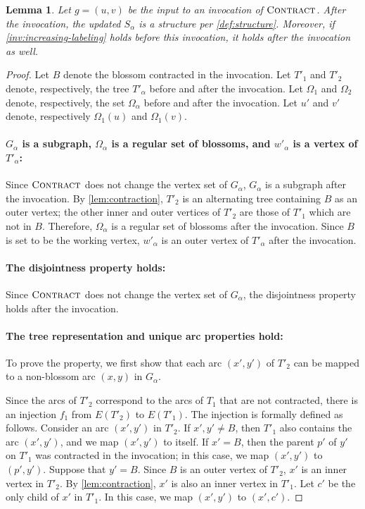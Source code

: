 \documentclass{article}
\newcommand{\alp}{\alpha}
\newcommand{\Omg}{\Omega}
\newcommand{\algContract}{\textsc{Contract}\xspace}
\newtheorem{lemma}[theorem]{Lemma}
\begin{document}
\begin{lemma} \label{lem:appendix2} Let $g = (u, v)$ be the input to an invocation of $\algContract$.
After the invocation, the updated $S_\alp$ is a structure per \cref{def:structure}.
Moreover, if \cref{inv:increasing-labeling} holds before this invocation, it holds after the invocation as well.
\end{lemma}
\begin{proof}
Let $B$ denote the blossom contracted in the invocation.
Let $T'_1$ and $T'_2$ denote, respectively, the tree $T'_\alp$ before and after the invocation.
Let $\Omg_1$ and $\Omg_2$ denote, respectively, the set $\Omg_\alp$ before and after the invocation.
Let $u'$ and $v'$ denote, respectively $\Omg_1(u)$ and $\Omg_1(v)$.

\paragraph{$G_\alp$ is a subgraph, $\Omg_\alp$ is a regular set of blossoms, and $w'_\alp$ is a vertex of $T'_\alp$:}
Since $\algContract$ does not change the vertex set of $G_\alp$, $G_\alp$ is a subgraph after the invocation.
By \cref{lem:contraction}, $T'_2$ is an alternating tree containing $B$ as an outer vertex;
the other inner and outer vertices of $T'_2$ are those of $T'_1$ which are not in $B$.
Therefore, $\Omg_\alp$ is a regular set of blossoms after the invocation.
Since $B$ is set to be the working vertex, $w'_\alp$ is an outer vertex of $T'_\alp$ after the invocation.

\paragraph{The disjointness property holds:} Since $\algContract$ does not change the vertex set of $G_\alp$, the disjointness property holds after the invocation.

\paragraph{The tree representation and unique arc properties hold:}
To prove the property, we first show that each arc $(x', y')$ of $T'_2$ can be mapped to a non-blossom arc $(x, y)$ in $G_\alp$.

Since the arcs of $T'_2$ correspond to the arcs of $T_1$ that are not contracted, there is an injection $f_1$ from $E(T'_2)$ to $E(T'_1)$.
The injection is formally defined as follows.
Consider an arc $(x', y')$ in $T'_2$.
If $x', y' \neq B$, then $T'_1$ also contains the arc $(x', y')$, and we map $(x', y')$ to itself.
If $x' = B$, then the parent $p'$ of $y'$ on $T'_1$ was contracted in the invocation; in this case, we map $(x', y')$ to $(p', y')$.
Suppose that $y' = B$.
Since $B$ is an outer vertex of $T'_2$, $x'$ is an inner vertex in $T'_2$.
By \cref{lem:contraction}, $x'$ is also an inner vertex in $T'_1$.
Let $c'$ be the only child of $x'$ in $T'_1$.
In this case, we map $(x', y')$ to $(x', c')$.


\end{proof}
\end{document}
